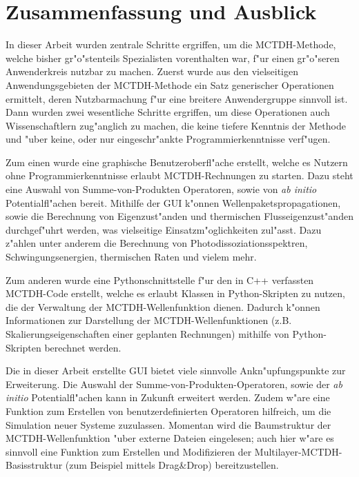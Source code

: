 \chapter{Zusammenfassung und Ausblick}
\label{cha:fazit}

In dieser Arbeit wurden zentrale Schritte ergriffen, um die MCTDH-Methode, welche bisher gr"o"stenteils
Spezialisten vorenthalten war, f"ur einen gr"o"seren Anwenderkreis nutz\-bar zu machen.
Zuerst wurde aus den vielseitigen Anwendungsgebieten der MCTDH-Methode ein Satz generischer
Operationen ermittelt, deren Nutzbarmachung f"ur eine breitere Anwendergruppe sinnvoll ist.
Dann wurden zwei wesentliche Schritte ergriffen, um diese Operationen auch
Wissenschaftlern zug"anglich zu machen, die keine tiefere Kenntnis der Methode und
"uber keine, oder nur eingeschr"ankte Programmierkenntnisse verf"ugen.

Zum einen wurde eine graphische Benutzeroberfl"ache erstellt, welche es Nutzern ohne
Programmierkenntnisse erlaubt MCTDH-Rechnungen zu starten. Dazu steht eine Aus\-wahl
von Summe-von-Produkten Operatoren, sowie von \textit{ab initio} Potentialfl"achen bereit.
Mithilfe der GUI k"onnen Wellenpaketspropagationen, sowie die Berechnung von Eigenzust"anden
und thermischen Flusseigenzust"anden durchgef"uhrt werden, was vielseitige Einsatzm"oglichkeiten
zul"asst. Dazu z"ahlen unter anderem die Berechnung von Photodissoziationsspektren, 
Schwingungsenergien, thermischen Raten und vielem mehr.

Zum anderen wurde eine Pythonschnittstelle f"ur den in C++ verfassten MCTDH-Code erstellt, 
welche es erlaubt Klassen in Python-Skripten zu nutzen, die der Verwaltung der MCTDH-Wellenfunktion dienen. 
Dadurch k"onnen Informationen zur Darstellung der MCTDH-Wellenfunktionen (z.B. Skalierungseigenschaften
einer geplanten Rechnungen) mithilfe von Python-Skripten berechnet werden.

Die in dieser Arbeit erstellte GUI bietet viele sinnvolle Ankn"upfungspunkte zur Erweiterung.
Die Auswahl der Summe-von-Produkten-Operatoren, sowie der \textit{ab initio} Potentialfl"achen kann in Zukunft
erweitert werden. Zudem w"are eine Funktion zum Erstellen von benutzerdefinierten Operatoren
hilfreich, um die Simulation neuer Systeme zuzulassen. Momentan wird die Baumstruktur der MCTDH-Wellenfunk\-tion
"uber externe Dateien eingelesen; auch hier w"are es sinnvoll eine Funktion zum
Erstellen und Modifizieren der Multilayer-MCTDH-Basisstruktur (zum Beispiel mit\-tels Drag\&Drop) bereitzustellen.

